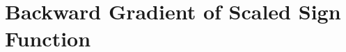 \documentclass[12pt]{article} %
\begin{document}

\section{Backward Gradient of Scaled Sign Function} %
\end{document}
